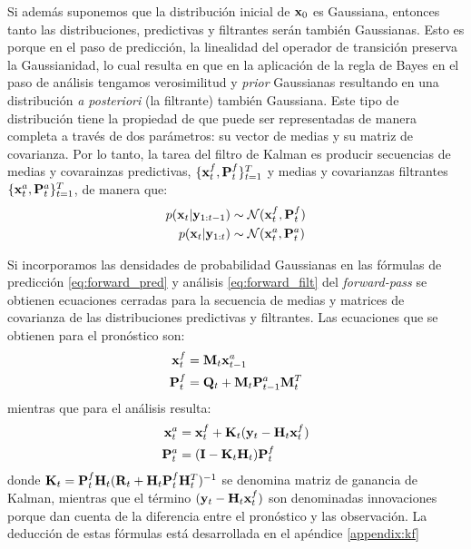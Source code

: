 Si además suponemos que la distribución inicial de $\mathbf{x}_0$ es Gaussiana, entonces tanto las distribuciones, predictivas y filtrantes serán también Gaussianas. Esto es porque en el paso de predicción, la linealidad del operador de transición preserva la Gaussianidad, lo cual resulta en que en la aplicación de la regla de Bayes en el paso de análisis tengamos verosimilitud y \textit{prior} Gaussianas resultando en una distribución \textit{a posteriori} (la filtrante) también Gaussiana. Este tipo de distribución tiene la propiedad de que puede ser representadas de manera completa a través de dos parámetros: su vector de medias y su matriz de covarianza. Por lo tanto, la tarea del filtro de Kalman es producir secuencias de medias y covarainzas predictivas, $\{\mathbf{x}_t^f, \mathbf{P}_t^f\}_{t=1}^{T}$ y medias y covarianzas filtrantes $\{\mathbf{x}_t^a, \mathbf{P}_t^a\}_{t=1}^{T}$, de manera que:
\begin{align*}
    p(\mathbf{x}_t | \mathbf{y}_{1:t-1}) &\sim \mathcal{N}(\mathbf{x}_t^f, \mathbf{P}_t^f) \\
    p(\mathbf{x}_t | \mathbf{y}_{1:t}) &\sim \mathcal{N}(\mathbf{x}_t^a, \mathbf{P}_t^a)
\end{align*}

Si incorporamos las densidades de probabilidad Gaussianas en las fórmulas de predicción \ref{eq:forward_pred} y análisis \ref{eq:forward_filt} del \textit{forward-pass} se obtienen ecuaciones cerradas para la secuencia de medias y matrices de covarianza de las distribuciones predictivas y filtrantes. Las ecuaciones que se obtienen para el pronóstico son:
\begin{align}
    \mathbf{x}_t^f &= \mathbf{M}_t \mathbf{x}_{t-1}^a \label{eq:kf_mean_pred}\\ 
    \mathbf{P}_t^f &= \mathbf{Q}_t + \mathbf{M}_t \mathbf{P}_{t-1}^a \mathbf{M}_t^T \label{eq:kf_var_pred}
\end{align}
mientras que para el análisis resulta:
\begin{align}
    \mathbf{x}_t^a &= \mathbf{x}_t^f + \mathbf{K}_t (\mathbf{y}_t - \mathbf{H}_t \mathbf{x}_t^f) \label{eq:kf_mean_filter} \\ 
    \mathbf{P}_t^a &= (\mathbf{I} - \mathbf{K}_t \mathbf{H}_t) \mathbf{P}_t^f \label{eq:kf_var_filter}
\end{align}
donde $\mathbf{K}_t = \mathbf{P}_t^f \mathbf{H}_t(\mathbf{R}_t + \mathbf{H}_t \mathbf{P}_t^f \mathbf{H}_t^T)^{-1}$ se denomina matriz de ganancia de Kalman, mientras que el término $(\mathbf{y}_t - \mathbf{H}_t \mathbf{x}_t^f)$ son denominadas innovaciones porque dan cuenta de la diferencia entre el pronóstico y las observación. La deducción de estas fórmulas está desarrollada en el apéndice \ref{appendix:kf}

